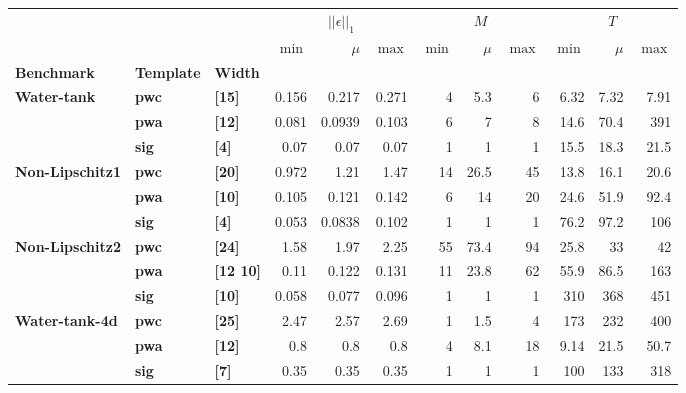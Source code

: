 \begin{tabular}{lllrrrrrrrrr}
\toprule
      &     &     & \multicolumn{3}{c}{$||\epsilon||_1$} & \multicolumn{3}{c}{$M$} & \multicolumn{3}{c}{$T$} \\
      &     &     &           $\min$ &  $\mu$ & $\max$ & $\min$ & $\mu$ & $\max$ & $\min$ & $\mu$ &   $\max$ \\
\textbf{Benchmark} & \textbf{Template} & \textbf{Width} &                  &        &        &        &       &        &        &       &          \\
\midrule
\textbf{Water-tank} & \textbf{pwc} & \textbf{[15]} &            0.156 &  0.217 &  0.271 &      4 &   5.3 &      6 &   6.32 &  7.32 &     7.91 \\
      & \textbf{pwa} & \textbf{[12]} &            0.081 & 0.0939 &  0.103 &      6 &     7 &      8 &   14.6 &  70.4 &      391 \\
      & \textbf{sig} & \textbf{[4]} &             0.07 &   0.07 &   0.07 &      1 &     1 &      1 &   15.5 &  18.3 &     21.5 \\
\textbf{Non-Lipschitz1} & \textbf{pwc} & \textbf{[20]} &            0.972 &   1.21 &   1.47 &     14 &  26.5 &     45 &   13.8 &  16.1 &     20.6 \\
      & \textbf{pwa} & \textbf{[10]} &            0.105 &  0.121 &  0.142 &      6 &    14 &     20 &   24.6 &  51.9 &     92.4 \\
      & \textbf{sig} & \textbf{[4]} &            0.053 & 0.0838 &  0.102 &      1 &     1 &      1 &   76.2 &  97.2 &      106 \\
\textbf{Non-Lipschitz2} & \textbf{pwc} & \textbf{[24]} &             1.58 &   1.97 &   2.25 &     55 &  73.4 &     94 &   25.8 &    33 &       42 \\
      & \textbf{pwa} & \textbf{[12 10]} &             0.11 &  0.122 &  0.131 &     11 &  23.8 &     62 &   55.9 &  86.5 &      163 \\
      & \textbf{sig} & \textbf{[10]} &            0.058 &  0.077 &  0.096 &      1 &     1 &      1 &    310 &   368 &      451 \\
\textbf{Water-tank-4d} & \textbf{pwc} & \textbf{[25]} &             2.47 &   2.57 &   2.69 &      1 &   1.5 &      4 &    173 &   232 &      400 \\
      & \textbf{pwa} & \textbf{[12]} &              0.8 &    0.8 &    0.8 &      4 &   8.1 &     18 &   9.14 &  21.5 &     50.7 \\
      & \textbf{sig} & \textbf{[7]} &             0.35 &   0.35 &   0.35 &      1 &     1 &      1 &    100 &   133 &      318 \\

\end{tabular}
